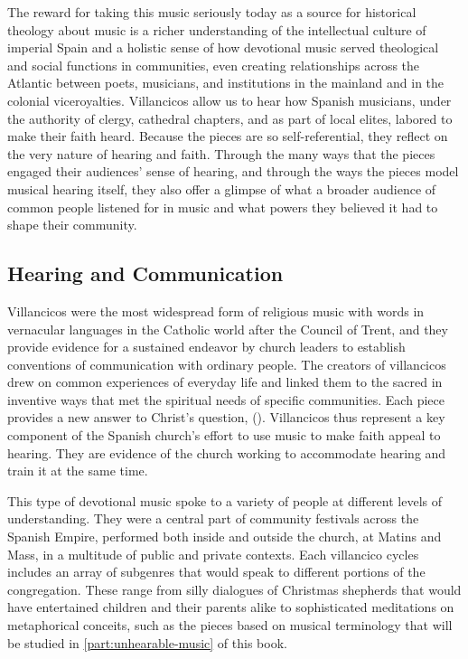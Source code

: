 The reward for taking this music seriously today as a source for historical
theology about music is a richer understanding of the intellectual culture of
imperial Spain and a holistic sense of how devotional music served theological
and social functions in communities, even creating relationships across the
Atlantic between poets, musicians, and institutions in the mainland and in
the colonial viceroyalties.
Villancicos allow us to hear how Spanish musicians, under the authority of
clergy, cathedral chapters, and as part of local elites, labored to make their
faith heard.
Because the pieces are so self-referential, they reflect on the very nature of
hearing and faith.
Through the many ways that the pieces engaged their audiences' sense of hearing,
and through the ways the pieces model musical hearing itself, they also offer a
glimpse of what a broader audience of common people listened for in music and
what powers they believed it had to shape their community.

\subsection{Hearing and Communication}

Villancicos were the most widespread form of religious music with words in
vernacular languages in the Catholic world after the Council of Trent, and they
provide evidence for a sustained endeavor by church leaders to establish
conventions of communication with ordinary people.
The creators of villancicos drew on common experiences of everyday life and
linked them to the sacred in inventive ways that met the spiritual needs of
specific communities.
Each piece provides a new answer to Christ's question, 
().
Villancicos thus represent a key component of the Spanish church's effort
to use music to make faith appeal to hearing.
They are evidence of the church working to accommodate hearing and train it at
the same time.

This type of devotional music spoke to a variety of people at different levels
of understanding.
They were a central part of community festivals across the Spanish Empire,
performed both inside and outside the church, at Matins and Mass, in a multitude
of public and private contexts.
Each villancico cycles includes an array of subgenres that would speak to
different portions of the congregation.
These range from silly dialogues of Christmas shepherds that would have
entertained children and their parents alike to sophisticated meditations on
metaphorical conceits, such as the pieces based on musical terminology that will
be studied in \cref{part:unhearable-music} of this book.

